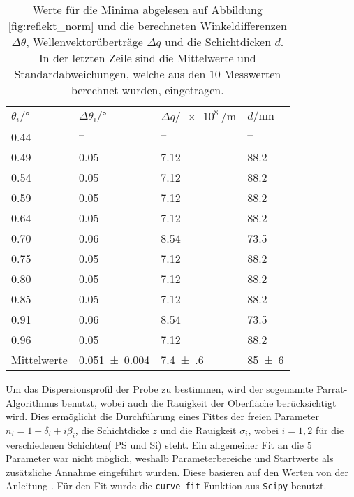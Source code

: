 \begin{table}
    \centering
    \begin{tabular}{@{}llll@{}}
    \toprule
     $\theta_i/ \si{\degree}$&$\Delta \theta_i / \si{\degree}$&$\Delta q / \SI{e8}{\per\metre} $&$d / \si{\nano\metre} $  \\ \midrule
     \num{0.44} &   $– $           &$– $   & $– $  \\
     \num{0.49} &\num{0.05 }   &\num{7.12}       & \num{88.2}  \\
     \num{0.54} &\num{0.05  }   &\num{7.12}      & \num{88.2} \\
     \num{0.59} &\num{0.05  }   &\num{7.12}      & \num{88.2} \\
     \num{0.64} &\num{0.05  }   &\num{7.12}      & \num{88.2} \\
     \num{0.70} &\num{0.06  }   &\num{8.54}      & \num{73.5} \\
     \num{0.75} &\num{0.05  }   &\num{7.12}      & \num{88.2} \\
     \num{0.80} &\num{0.05  }   &\num{7.12}      & \num{88.2} \\
     \num{0.85} &\num{0.05  }   &\num{7.12}      & \num{88.2} \\
     \num{0.91} &\num{0.06  }   &\num{8.54}      & \num{73.5} \\
     \num{0.96} &\num{0.05  }   &\num{7.12}      & \num{88.2} \\ \midrule
      Mittelwerte    &\num{0.051(4)} &\num{7.4(6)}  & \num{85(6)} \\ \bottomrule
    \end{tabular}
    \caption{Werte für die Minima abgelesen auf Abbildung \ref{fig:reflekt_norm} und die berechneten Winkeldifferenzen $\Delta \theta$, Wellenvektorüberträge $\Delta q$ und die Schichtdicken $d$. In der letzten Zeile sind die Mittelwerte und Standardabweichungen, welche aus den $10$ Messwerten berechnet wurden, eingetragen.}
    \label{tab:minima}
\end{table} 
Um das Dispersionsprofil der Probe zu bestimmen, wird der sogenannte Parrat-Algorithmus benutzt, wobei auch die Rauigkeit der Oberfläche berücksichtigt wird. 
Dies ermöglicht die Durchführung eines Fittes der freien Parameter $n_i = 1 -\delta_i +i\beta_i $, die Schichtdicke $z$ und die Rauigkeit $\sigma_i$, wobei $i = 1,2$ für die verschiedenen Schichten( PS und Si) steht. 
Ein allgemeiner Fit an die $5$ Parameter war nicht möglich, weshalb Parameterbereiche und Startwerte als zusätzliche Annahme eingeführt wurden. Diese basieren auf den Werten von der Anleitung \cite{kiessig}. Für den Fit wurde die \texttt{curve\_fit}-Funktion aus \texttt{Scipy} \cite{scipy} benutzt. 
